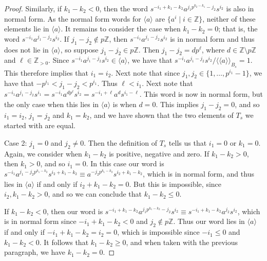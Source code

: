 \documentclass[11pt]{amsart}
\theoremstyle{definition}
\numberwithin{theorem}{section}
\newcommand{\Z}{\mathbb{Z}}
\begin{document}
\begin{proof}
		Similarly, if \(k_1 - k_2 <
		0\), then the word \(s^{-i_1 + k_1 - k_2} a^{j_1 p^{k_2 - k_1} - j_2}
		s^{i_2}\) is also in normal form. As the normal form words for
		\(\langle a \rangle\) are \(\{a^i \mid i \in \Z\}\), neither of these
		elements lie in \(\langle a \rangle\). It remains to consider the case
		when \(k_1 - k_2 = 0\); that is, the word \(s^{-i_1} a^{j_1 - j_2}
		s^{i_2}\). If \(j_1 - j_2 \notin p \Z\), then \(s^{-i_1} a^{j_1 - j_2}
		s^{i_2}\) is in normal form and thus does not lie in \(\langle a
		\rangle\), so suppose \(j_1 - j_2 \in p\Z\). Then \(j_1 - j_2 = d
		p^\ell\), where \(d \in \Z \setminus p \Z\) and \(\ell \in \Z_{> 0}\).
		Since \(s^{-i_1} a^{j_1 - j_2} s^{i_2} \in \langle a \rangle\), we have
		that \(s^{-i_1} a^{j_1 - j_2} s^{i_2} / \langle \langle a \rangle
		\rangle_{B_s} = 1\). 
This therefore implies that \(i_1 = i_2\).
Next note that since \(j_1, j_2 \in \{ 1, \ldots,
		p^{i_1} - 1\}\), we have that \(-p^{i_1} < j_1 - j_2 < p^{i_1}\). Thus
		\(\ell < i_1\). Next note that \(s^{-i_1} a^{j_1 - j_2} s^{i_1}
		= s^{-i_1} a^{d p^\ell} s^{i_2} = s^{-i_1 + \ell} a^d s^{i_1 - \ell}\).
		This word is now in normal form, but the only case when this
		lies in \(\langle a \rangle\) is when \(d = 0\). This implies
		\(j_1 - j_2 = 0\), and so \(i_1 = i_2\), \(j_1 = j_2\) and
		\(k_1 = k_2\), and we have shown that the two elements of
		\(T_s\) we started with are equal.

		Case 2: \(j_1 = 0\) and \(j_2 \neq 0\). Then the definition of
		\(T_s\) tells us that \(i_1 = 0\) or \(k_1 = 0\). 
		Again, we consider when \(k_1 - k_2\) is positive, negative and zero.
		If \(k_1 - k_2 > 0\), then \(k_1 > 0\), and so \(i_1 = 0\). In this
		case our word is \(s^{-i_1} a^{j_1 - j_2 p^{k_1 - k_2}} s^{i_2 + k_1 - k_2}
		\equiv a^{-j_2 p^{k_1 - k_2}} s^{i_2 + k_1 - k_2}\), which is in normal
		form, and thus lies in \(\langle a \rangle\) if and only if
		\(i_2 + k_1 - k_2 = 0\). But this is impossible, since \(i_2, k_1 - k_2 >0\),
		and so we can conclude that \(k_1 - k_2 \leq 0\).

		If \(k_1 - k_2 < 0\), then our word is
		\(s^{-i_1 + k_1 - k_2} a^{j_1 p^{k_1 - k_2} - j_2} s^{i_2}
		\equiv s^{-i_1 + k_1 - k_2} a^{j_2} s^{i_2}\), which is
		in normal form since \(-i_1 + k_1 - k_2 < 0\) and \(j_2 \notin p \Z\).
		Thus our word lies in \(\langle a \rangle\) if and only if
		\(-i_1 + k_1 - k_2 = i_2 = 0\), which is impossible since
		\(-i_1 \leq 0\) and \(k_1 - k_2 < 0\). It follows that
		\(k_1 - k_2 \geq 0\), and when taken with the previous paragraph,
		we have \(k_1 - k_2 = 0\).


\end{proof}
\end{document}
